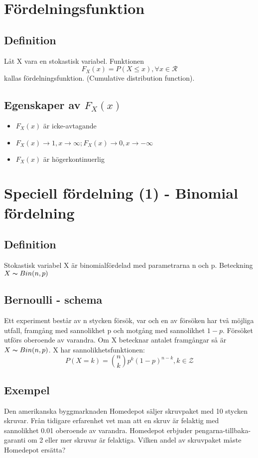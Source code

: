 \documentclass{article}
\begin{document}
\section{Fördelningsfunktion}
\subsection{Definition}
Låt X vara en stokastisk variabel. Funktionen
$$ F_X(x) = P(X\le x), \forall x \in \mathcal{R} $$
kallas fördelningsfunktion. (Cumulative distribution function).\\

\subsection{Egenskaper av $F_X(x)$}
\begin{itemize}
    \item $F_X(x)$ är icke-avtagande
    \item $F_X(x)\rightarrow 1, x\rightarrow \infty; F_X(x) \rightarrow 0, x\rightarrow -\infty$
    \item $F_X(x)$ är högerkontinuerlig
\end{itemize}

\section{Speciell fördelning (1) - Binomial fördelning}
\subsection{Definition}
Stokastisk variabel X är binomialfördelad med parametrarna n och p. Beteckning $X \thicksim Bin(n, p)$

\subsection{Bernoulli - schema}
Ett experiment består av n stycken försök, var och en av försöken har två möjliga utfall, framgång med sannolikhet p och motgång med sannolikhet $1-p$.
Försöket utförs oberoende av varandra. Om X betecknar antalet framgångar så är $X \thicksim Bin(n, p)$. X har sannolikhetsfunktionen:
$$ P(X=k) = {n \choose k} p^k (1-p)^{n-k}, k\in \mathcal{Z}$$

\subsection{Exempel}
Den amerikanska byggmarknaden Homedepot säljer skruvpaket med 10 stycken skruvar. Från tidigare erfarenhet vet man att en skruv är felaktig med sannolikhet 0.01 oberoende av varandra.
Homedepot erbjuder pengarna-tillbaka-garanti om 2 eller mer skruvar är felaktiga. Vilken andel av skruvpaket måste Homedepot ersätta?\\
\end{document}
